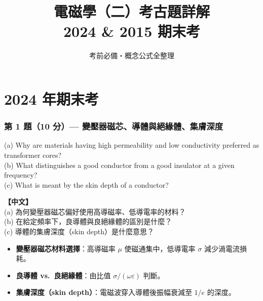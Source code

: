 \documentclass[12pt,a4paper]{article}
\title{\Huge\bfseries 電磁學（二）考古題詳解\\[10pt]
\Large 2024 \& 2015 期末考}
\author{考前必備・概念公式全整理}
\date{}
\begin{document}
\maketitle
\thispagestyle{empty}
\tableofcontents
\newpage

\part{2024 年期末考}

\section{第 1 題（10 分）— 變壓器磁芯、導體與絕緣體、集膚深度}

\begin{questionbox}
(a) Why are materials having high permeability and low conductivity preferred as transformer cores?\\
(b) What distinguishes a good conductor from a good insulator at a given frequency?\\
(c) What is meant by the skin depth of a conductor?

\medskip\noindent\textbf{【中文】}\\
(a) 為何變壓器磁芯偏好使用高導磁率、低導電率的材料？\\
(b) 在給定頻率下，良導體與良絕緣體的區別是什麼？\\
(c) 導體的集膚深度（skin depth）是什麼意思？
\end{questionbox}

\begin{conceptbox}[核心概念]
\begin{itemize}
  \item \textbf{變壓器磁芯材料選擇}：高導磁率 $\mu$ 使磁通集中，低導電率 $\sigma$ 減少渦電流損耗。
  \item \textbf{良導體 vs.\ 良絕緣體}：由比值 $\sigma / (\omega\varepsilon)$ 判斷。
  \item \textbf{集膚深度（skin depth）}：電磁波穿入導體後振幅衰減至 $1/e$ 的深度。
\end{itemize}
\end{conceptbox}
\end{document}
